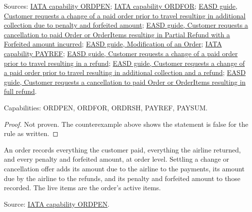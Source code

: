 \begin{theorem}
  Sources: \href{https://retailing.iata.org/armi/docs/ORDPEN/}{IATA capability ORDPEN};
  \href{https://retailing.iata.org/armi/docs/ORDFOR/}{IATA capability ORDFOR};
  \href{https://standards.atlassian.net/wiki/spaces/EASD/pages/842268745}{EASD guide, Customer requests a change of a paid order prior to travel resulting in additional collection due to penalty and forfeited amount};
  \href{https://standards.atlassian.net/wiki/spaces/EASD/pages/817594543}{EASD guide, Customer requests a cancellation to paid Order or OrderItems resulting in Partial Refund with a Forfeited amount incurred};
  \href{https://standards.atlassian.net/wiki/spaces/EASD/pages/574619782}{EASD guide, Modification of an Order};
  \href{https://retailing.iata.org/armi/docs/PAYREF/}{IATA capability PAYREF};
  \href{https://standards.atlassian.net/wiki/spaces/EASD/pages/842268768/Customer+requests+a+change+of+a+paid+order+prior+to+travel+resulting+in+a+refund}{EASD guide, Customer requests a change of a paid order prior to travel resulting in a refund};
  \href{https://standards.atlassian.net/wiki/spaces/EASD/pages/842301447/Customer+requests+a+change+of+a+paid+order+prior+to+travel+resulting+in+additional+collection+and+a+refund}{EASD guide, Customer requests a change of a paid order prior to travel resulting in additional collection and a refund};
  \href{https://standards.atlassian.net/wiki/spaces/EASD/pages/817594417/Customer+requests+a+cancellation+to+paid+Order+or+OrderItems+resulting+in+full+refund}{EASD guide, Customer requests a cancellation to paid Order or OrderItems resulting in full refund}.

  Capabilities: ORDPEN, ORDFOR, ORDRSH, PAYREF, PAYSUM.
\end{theorem}
\begin{proof}
  Not proven.  The counterexample above shows the statement is false for the
  rule as written.
\end{proof}

\begin{definition}
  \label{def:change-cancellation-ledger}
  An order records everything the customer paid, everything the airline
  returned, and every penalty and forfeited amount, at order level.  Settling
  a change or cancellation offer adds its amount due to the airline to the
  payments, its amount due by the airline to the refunds, and its penalty and
  forfeited amount to those recorded.  The live items are the order's active
  items.

  Source: \href{https://retailing.iata.org/armi/docs/ORDPEN/}{IATA capability ORDPEN}.
\end{definition}

